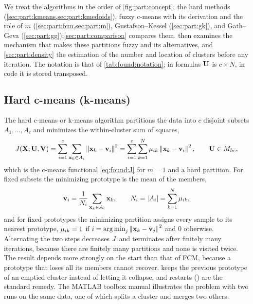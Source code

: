 We treat the algorithms in the order of \cref{fig:part:concept}: the hard methods (\cref{sec:part:kmeans,sec:part:kmedoids}), fuzzy c-means with its derivation and the role of $m$ (\cref{sec:part:fcm,sec:part:m}), Gustafson--Kessel (\cref{sec:part:gk}), and Gath--Geva (\cref{sec:part:gg});\cref{sec:part:comparison} compares them.  then examines the mechanism that makes these partitions fuzzy and its alternatives, and \cref{sec:part:density} the estimation of the number and location of clusters before any iteration. The notation is that of \cref{tab:found:notation}; in formulas $\mathbf{U}$ is $c\times N$, in code it is stored transposed.

\subsection{Hard c-means (k-means)}\label{sec:part:kmeans}

The hard c-means or k-means algorithm \cite{macqueen:1967:kmeans} partitions the data into $c$ disjoint subsets $A_1,\dots,A_c$ and minimizes the within-cluster sum of squares,
\begin{equation}
  J(\mathbf{X};\mathbf{U},\mathbf{V})=\sum_{i=1}^{c}\sum_{\mathbf{x}_k\in A_i}\left\lVert \mathbf{x}_k-\mathbf{v}_i \right\rVert^2=\sum_{i=1}^{c}\sum_{k=1}^{N}\mu_{ik}\left\lVert \mathbf{x}_k-\mathbf{v}_i \right\rVert^2,\qquad \mathbf{U}\in M_{hc},
  \label{eq:part:Jkm}
\end{equation}
which is the c-means functional \eqref{eq:found:J} for $m=1$ and a hard partition. For fixed subsets the minimizing prototype is the mean of the members,
\begin{equation}
  \mathbf{v}_i=\frac{1}{N_i}\sum_{\mathbf{x}_k\in A_i}\mathbf{x}_k,\qquad N_i=\left\lvert A_i \right\rvert=\sum_{k=1}^{N}\mu_{ik},
  \label{eq:part:vkm}
\end{equation}
and for fixed prototypes the minimizing partition assigns every sample to its nearest prototype, $\mu_{ik}=1$ if $i=\operatorname{arg\,min}_j\left\lVert \mathbf{x}_k-\mathbf{v}_j \right\rVert^2$ and $0$ otherwise. Alternating the two steps decreases $J$ and terminates after finitely many iterations, because there are finitely many partitions and none is visited twice. The result depends more strongly on the start than that of FCM, because a prototype that loses all its members cannot recover.  keeps the previous prototype of an emptied cluster instead of letting it collapse, and restarts () are the standard remedy. The MATLAB toolbox manual illustrates the problem with two runs on the same data, one of which splits a cluster and merges two others.

